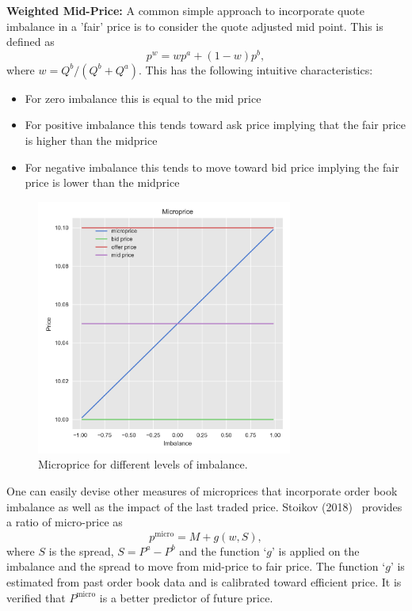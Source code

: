 \noindent\textbf{Weighted Mid-Price:} A common simple approach to incorporate quote imbalance in a 'fair' price is to consider the quote adjusted mid point. This is defined as
	\begin{equation}\label{eqn:microprice}
		p^w= w p^a + (1-w) p^b,
	\end{equation}
where $w= Q^b/(Q^b+Q^a)$. This has the following intuitive characteristics: 
	\begin{itemize}
	\item For zero imbalance this is equal to the mid price
	\item For positive imbalance this tends toward ask price implying that the fair price is higher than the midprice
	\item For negative imbalance this tends to move toward bid price implying the fair price is lower than the midprice
\end{itemize}
	\begin{figure}[!ht]
	\centering
	\includegraphics[width=0.75\textwidth]{chapters/chapter_trade_data_models/figures/microprice.png} 
	\caption{Microprice for different levels of imbalance. \label{fig:microprice}}
	\end{figure}

One can easily devise other measures of microprices that incorporate order book imbalance as well as the impact of the last traded price. Stoikov (2018)~\cite{stoikov18} provides a ratio of micro-price as
	\begin{equation} \label{eqn:pmicro}
	p^\text{micro}= M + g(w,S),
	\end{equation}
where $S$ is the spread, $S= P^a - P^b$ and the function `$g$' is applied on the imbalance and the spread to move from mid-price to fair price. The function `$g$' is estimated from past order book data and is calibrated toward efficient price. It is verified that $P^\text{micro}$ is a better predictor of future price. \twomedskip


